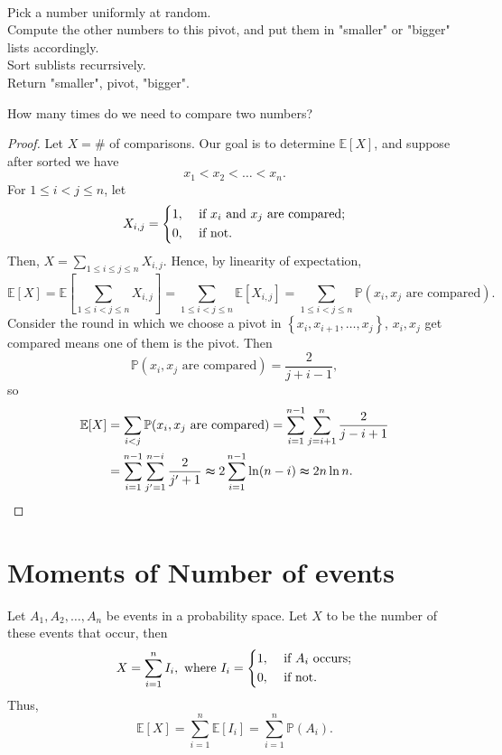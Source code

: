 \begin{eg}
\quad \\
    \begin{algorithm}[H]
    \caption{Quick Sort}
        Pick a number uniformly at random. \\
        Compute the other numbers to this pivot, and put them in "smaller" or "bigger" lists accordingly. \\
        Sort sublists recurrsively. \\
        Return "smaller", pivot, "bigger". 
    \end{algorithm}

    How many times do we need to compare two numbers?
\end{eg}

\begin{proof}
    Let \(X = \#\) of comparisons. Our goal is to determine \(\mathbb{E} [X]\), and suppose after sorted we have
    \[
        x_1 < x_2 < \dots < x_n.
    \]
    For \(1 \le i < j \le n\), let 
    \[
        X_{i, j} = \begin{dcases}
            1, &\text{ if } x_i \text{ and } x_j \text{ are compared}    ;\\
            0, &\text{ if not}.
        \end{dcases}
    \]   
    Then, \(X = \sum_{1 \le i \le j \le n} X_{i, j} \). Hence, by linearity of expectation,
    \[
        \mathbb{E} [X] = \mathbb{E} \left[ \sum_{1 \le i < j \le n} X_{i, j}  \right] = \sum_{1 \le i < j \le n} \mathbb{E} [X_{i, j}] = \sum_{1 \le i < j \le n} \mathbb{P}(x_i, x_j \text{ are compared}).   
    \] 
    Consider the round in which we choose a pivot in \(\left\{ x_i, x_{i+1}, \dots , x_j \right\} \), \(x_i, x_j\) get compared means one of them is the pivot. Then
    \[
        \mathbb{P} (x_i, x_j \text{ are compared}) = \frac{2}{j + i - 1},
    \]  
    so 
    \begin{align*}
        \mathbb{E} [X] &= \sum_{i < j} \mathbb{P} (x_i, x_j \text{ are compared}) = \sum_{i=1}^{n-1} \sum_{j = i + 1}^n \frac{2}{j - i + 1} \\
        &= \sum_{i=1}^{n-1} \sum_{j^{\prime} = 1}^{n - i} \frac{2}{j^{\prime} + 1} \thickapprox 2 \sum_{i=1}^{n - 1} \ln (n - i) \thickapprox 2 n \ln n.      
    \end{align*}
\end{proof}

\section{Moments of Number of events}
Let \(A_1, A_2, \dots , A_n\) be events in a probability space. Let \(X\) to be the number of these events that occur, then 
\[
    X = \sum_{i=1}^n I_i, \text{ where } I_i = \begin{dcases}
        1, &\text{ if } A_i \text{ occurs}  ;\\
        0, &\text{ if not}.
    \end{dcases}  
\]  
Thus,
\[
    \mathbb{E} [X] = \sum_{i=1}^n \mathbb{E} [I_i] = \sum_{i=1}^n \mathbb{P} (A_i).  
\]

